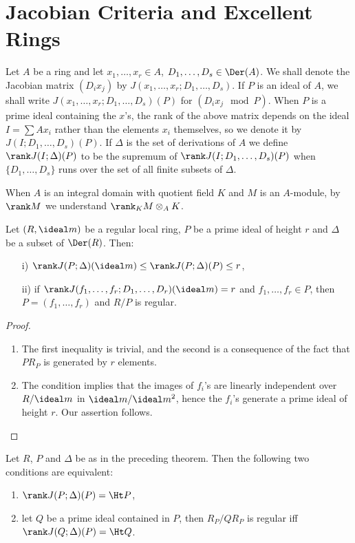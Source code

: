 \documentclass[../main]{subfiles}
\begin{document}
\section{Jacobian Criteria and Excellent Rings}\label{sec:40}
\newparagraph Let $A$ be a ring and let $x_1, \ldots, x_r \in A$, $D_1, \ldots, D_s \in \Der(A)$. We shall denote the Jacobian matrix $(D_i x_j)$ by $J(x_1, \ldots, x_r; D_1, \ldots, D_s)$. If $P$ is an ideal of $A$, we shall write $J(x_1, \ldots, x_r; D_1, \ldots, D_s)(P)$ for $(D_i x_j \mod P)$. When $P$ is a prime ideal containing the $x$'s, the rank of the above matrix depends on the ideal $I = \sum A x_i$ rather than the elements $x_i$ themselves, so we denote it by $J(I; D_1, \ldots, D_s)(P)$. If $\Delta$ is the set of derivations of $A$ we define $\rank J(I; \Delta)(P)$ to be the supremum of $\rank J(I; D_1, \ldots, D_s)(P)$ when $\{D_1, \ldots, D_s\}$ runs over the set of all finite subsets of $\Delta$. 

When $A$ is an integral domain with quotient field $K$ and $M$ is an $A$-module, by $\rank M$ we understand $\rank_K M \otimes_A K$.

\begin{theorem}\label{thm:094}
Let $(R, \ideal m)$ be a regular local ring, $P$ be a prime ideal of height $r$ and $\Delta$ be a subset of $\Der(R)$. Then: 
\begin{enumerate}
    \item[i)] $\rank J(P; \Delta)(\ideal m) \le \rank J(P; \Delta)(P) \le r$,
    \item[ii)] if $\rank J(f_1, \ldots, f_r; D_1, \ldots, D_r)(\ideal m) = r$ and $f_1, \ldots, f_r \in P$, then $P = (f_1, \ldots, f_r)$ and $R/P$ is regular. 
\end{enumerate}
\end{theorem}

\begin{proof}
\begin{enumerate}[label = \roman*)]
    \item The first inequality is trivial, and the second is a consequence of the fact that $P R_P$ is generated by $r$ elements.
    \item The condition implies that the images of $f_i$'s are linearly independent over $R/\ideal m$ in $\ideal m/\ideal m^2$, hence the $f_i$'s generate a prime ideal of height $r$. Our assertion follows.
\end{enumerate}
\end{proof}

\begin{theorem}\label{thm:095}
Let $R$, $P$ and $\Delta$ be as in the preceding theorem. Then the following two conditions are equivalent: 

\begin{enumerate}[label = (\arabic*)]
    \item $\rank J(P; \Delta)(P) = \Ht P$,
    \item let $Q$ be a prime ideal contained in $P$, then $R_P/QR_P$ is regular iff \newline $\rank J(Q; \Delta)(P) = \Ht Q$.
\end{enumerate}
\end{theorem}
\end{document}
